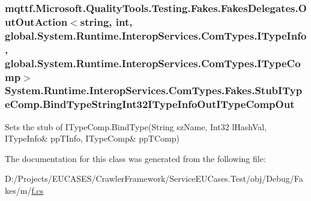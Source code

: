\hypertarget{class_system_1_1_runtime_1_1_interop_services_1_1_com_types_1_1_fakes_1_1_stub_i_type_comp_a25ed2c42aed624d8638df8b3bacfb0ca}{
\subsubsection[{Bind\-Type\-String\-Int32\-I\-Type\-Info\-Out\-I\-Type\-Comp\-Out}]{\setlength{\rightskip}{0pt plus 5cm}mqttf.\-Microsoft.\-Quality\-Tools.\-Testing.\-Fakes.\-Fakes\-Delegates.\-Out\-Out\-Action$<$string, int, global.\-System.\-Runtime.\-Interop\-Services.\-Com\-Types.\-I\-Type\-Info, global.\-System.\-Runtime.\-Interop\-Services.\-Com\-Types.\-I\-Type\-Comp$>$ System.\-Runtime.\-Interop\-Services.\-Com\-Types.\-Fakes.\-Stub\-I\-Type\-Comp.\-Bind\-Type\-String\-Int32\-I\-Type\-Info\-Out\-I\-Type\-Comp\-Out}}\label{class_system_1_1_runtime_1_1_interop_services_1_1_com_types_1_1_fakes_1_1_stub_i_type_comp_a25ed2c42aed624d8638df8b3bacfb0ca}


Sets the stub of I\-Type\-Comp.\-Bind\-Type(String sz\-Name, Int32 l\-Hash\-Val, I\-Type\-Info\& pp\-T\-Info, I\-Type\-Comp\& pp\-T\-Comp)



The documentation for this class was generated from the following file\-:\begin{DoxyCompactItemize}
\item 
D\-:/\-Projects/\-E\-U\-C\-A\-S\-E\-S/\-Crawler\-Framework/\-Service\-E\-U\-Cases.\-Test/obj/\-Debug/\-Fakes/m/\hyperlink{m_2f_8cs}{f.\-cs}\end{DoxyCompactItemize}
